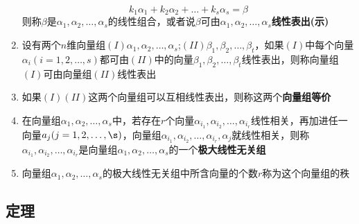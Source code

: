 \documentclass[a4paper,12pt]{article}
\begin{document}
\begin{enumerate}
        \[
            k_{1}\alpha_1 + k_{2}\alpha_2 + \dots + k_{s}\alpha_s = \beta
        \]
        则称$\beta$是$\alpha_1, \alpha_2, \dots, \alpha_s$的线性组合，或者说$\beta$可由$\alpha_1, \alpha_2, \dots, \alpha_s$\textbf{线性表出(示)}
        \item 设有两个$n$维向量组$(I)\alpha_1, \alpha_2, \dots, \alpha_s$;$(II)\beta_1, \beta_2, \dots, \beta_t$，如果$(I)$中每个向量$\alpha_i(i = 1,2,\dots,s)$都可由$(II)$中的向量$\beta_1, \beta_2, \dots, \beta_t$线性表出，则称向量组$(I)$可由向量组$(II)$线性表出
        \item 如果$(I)(II)$这两个向量组可以互相线性表出，则称这两个\textbf{向量组等价}
        \item 在向量组$\alpha_1, \alpha_2, \dots, \alpha_s$中，若存在$r$个向量$\alpha_{i_1}, \alpha_{i_2}, \dots, \alpha_{i_r}$线性相关，再加进任一向量$a_j(j = 1,2,\dots,\s)$，向量组$\alpha_{i_1}, \alpha_{i_2}, \dots, \alpha_{i_r}, \alpha_j$就线性相关，则称$\alpha_{i_1}, \alpha_{i_2}, \dots, \alpha_{i_r}$是向量组$\alpha_1, \alpha_2, \dots, \alpha_s$的一个\textbf{极大线性无关组}
        \item 向量组$\alpha_1, \alpha_2, \dots, \alpha_s$的极大线性无关组中所含向量的个数$r$称为这个向量组的秩
    \end{enumerate}

    \subsection{定理}
\end{document}
